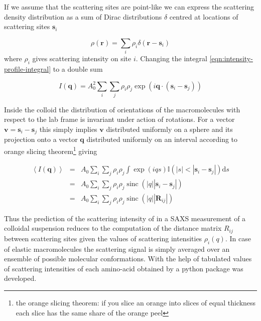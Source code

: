 \documentclass{doctoral}
\newcommand{\dd}{\mathrm{d}}
\newcommand{\code}[1]{\texttt{\detokenize{#1}}}
\begin{document}
If we assume that the scattering sites are point-like we can express the scattering density distribution as a sum of Dirac distributions $\delta$ centred at locations of scattering sites $\mathbf{s}_i$ 

\begin{equation}
    \rho(\mathbf{r}) = \sum_i \rho_i \delta(\mathbf{r}-\mathbf{s}_i)
\end{equation}
where $\rho_i$ gives scattering intensity on site $i$.
Changing the integral \eqref{eqn:intensity-profile-integral} to a double sum 

\begin{equation}
    I(\mathbf{q}) = A_0^2 \sum_i \sum_j \rho_i \rho_j \exp(i \mathbf{q} \cdot (\mathbf{s}_i - \mathbf{s}_j))
\end{equation}

Inside the colloid the distribution of orientations of the macromolecules with respect to the lab frame is invariant under action of rotations.
For a vector $\mathbf{v} = \mathbf{s}_i - \mathbf{s}_j$ this simply implies $\mathbf{v}$ distributed uniformly on a sphere and its projection onto a vector $\mathbf{q}$ distributed uniformly on an interval according to orange slicing theorem\footnote{the orange slicing theorem: if you slice an orange into slices of equal thickness each slice has the same share of the orange peel} giving 

\begin{eqnarray}
    \left< I(\mathbf{q}) \right> & = & A_0 \sum_i \sum_j \rho_i \rho_j \int \exp(i q s) \mathbb{I}(|s| < |\mathbf{s}_i - \mathbf{s}_j|) \dd s \\
                                 & = & A_0 \sum_i \sum_j \rho_i \rho_j \operatorname{sinc}(|q||\mathbf{s}_i - \mathbf{s}_j|)                  \\
                                 & = & A_0 \sum_i \sum_j \rho_i \rho_j \operatorname{sinc}(|q||\mathbf{R}_{ij}|)
\end{eqnarray}

Thus the prediction of the scattering intensity of in a SAXS measurement of a colloidal suspension reduces to the computation of the distance matrix $R_{ij}$ between scattering sites given the values of scattering intensities $\rho_i(q)$.
In case of elastic macromolecules the scattering signal is simply averaged over an ensemble of possible molecular conformations.
With the help of tabulated values of scattering intensities of each amino-acid obtained by \textcite{Tong_2016} a python package \code{saxs_single_bead} was developed.
\end{document}
